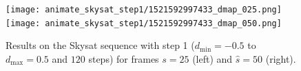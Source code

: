 \documentclass{article}
\theoremstyle{definition}
\begin{document}
\begin{figure}[ht]
  \centering
  \texttt{[image: animate\_skysat\_step1/1521592997433\_dmap\_025.png]}
  \texttt{[image: animate\_skysat\_step1/1521592997433\_dmap\_050.png]}
  \caption{Results on the Skysat sequence with step 1 ($d_{\min} = -0.5$ to $d_{\max} = 0.5$ and $120$ steps) for frames $s=25$ (left) and $\widehat{s}=50$ (right).}
  \label{fig:finetocoarse:res:skysat1}
\end{figure}


\clearpage


\end{document}
